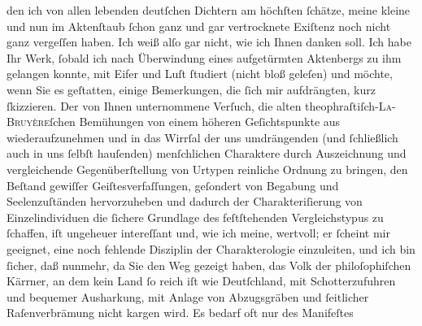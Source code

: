 \begin{ledgroupsized}[t]{13cm}
               den ich von allen lebenden deutſchen Dichtern am höchſten ſchätze, meine kleine und
               nun im Aktenſtaub ſchon ganz und gar vertrocknete Exiſtenz noch nicht ganz vergeſſen
               haben. Ich weiß alſo gar nicht, wie ich Ihnen danken soll.\pend
           \pstart
           Ich habe Ihr Werk, ſobald ich
               nach Überwindung eines aufgetürmten Ak{\pb}tenbergs zu ihm gelangen konnte, mit Eifer und Luſt ſtudiert (nicht bloß geleſen)
               und möchte, wenn Sie es geſtatten, einige Bemerkungen, die ſich mir aufdrängten, kurz
               ſkizzieren.\pend
           \pstart
           Der von Ihnen unternommene Verſuch, die alten theophraſtiſch-\textsc{La-Bruyère}ſchen Bemühungen von einem höheren Geſichtspunkte aus wiederaufzunehmen und in
               das Wirrſal der uns umdrängenden (und ſchließlich auch in uns ſelbſt hauſenden)
               menſchlichen Charaktere durch Auszeichnung und vergleichende Gegenüberſtellung von
               Urtypen reinliche Ordnung zu bringen, den Beſtand gewiſſer Geiſtesverfaſſungen,
               geſondert von Begabung und Seelenzuſtänden hervorzuheben und dadurch der
               Charakteriſierung von Einzelindividuen die ſichere Grundlage des feſtſtehenden
               Vergleichstypus {\pb}zu ſchaffen, iſt
               ungeheuer intereſſant und, wie ich meine, wertvoll; er ſcheint mir geeignet, eine
               noch fehlende Disziplin der Charakterologie einzuleiten, und ich bin ſicher, daß
               nunmehr, da Sie den Weg gezeigt haben, das Volk der philoſophiſchen Kärrner, an dem
               kein Land ſo reich iſt wie Deutſchland, mit
               Schotterzufuhren und bequemer Ausharkung, mit Anlage von Abzugsgräben und ſeitlicher
               Raſenverbrämung nicht kargen wird. Es bedarf oft nur des Manifeſtes \introOben{}\label{T_L02483_1v}
\end{ledgroupsized}
